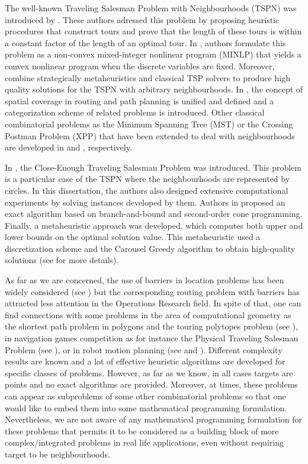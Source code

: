 \documentclass[a4paper,  review, authoryear, 1p.]{elsarticle}
\newcommand{\CV}[1]{{\color{red}#1}}
\begin{document}
		The well-known Traveling Salesman Problem with Neighbourhoods (TSPN) was introduced by \citet{arkin_approximation_1994}. These authors adressed this problem by proposing heuristic procedures that construct tours and prove that the length of these tours is within a constant factor of the length of an optimal tour. In \citet{gentilini_travelling_2013}, authors formulate this problem as a non-convex mixed-integer nonlinear program (MINLP) that yields a convex nonlinear program when the discrete variables are fixed. Moreover, \citet{yuan_towards_2017} combine strategically metaheuristics and classical TSP solvers to produce high quality solutions for the TSPN with arbitrary neighbourhoods. In \citet{glock_spatial_2022}, the concept of spatial coverage in routing and path planning is unified and defined and a categorization scheme of related problems is introduced. Other classical combinatorial problems as the Minimum Spanning Tree (MST) or the Crossing Postman Problem (XPP) that have been  extended to deal with neighbourhoods are developed in \citet{blanco_minimum_2017} and \citet{puerto_routing_2022}, respectively. 
		
		\CV{In \citet{mennell_heuristics_2009}, the Close-Enough Traveling Salesman Problem was introduced. This problem is a particular case of the TSPN where the neighbourhoods are represented by circles. In this dissertation, the authors also designed extensive computational experiments by solving instances developed by them. Authors in \citet{coutinho_branch-and-bound_2016} proposed an exact algorithm based on branch-and-bound and second-order cone programming. Finally, a metaheuristic approach was developed,  which computes both upper and lower bounds on the optimal solution value. This metaheuristic used a  discretization scheme and the Carousel Greedy algorithm to obtain high-quality solutions (see \citet{carrabs_adaptive_2020} for more details).}
		
		As far as we are concerned, the use of barriers in location problems has been widely considered (see \citet{klamroth_single-facility_2002}) but the corresponding routing problem with barriers  has attracted less attention in the Operations Research field. In spite of that, one can find connections with some problems in the area of computational geometry as the shortest path problem in polygons and the touring polytopes problem (see \citet{mitchell_shortest_2017}), in navigation games competition  as for instance the Physical Traveling Salesman Problem (see \citet{perez_solving_2014}), or in robot motion planning (see \citet{hwang_potential_1992} and \citet{laumond_motion_1994}).  Different complexity results are known and a lot of effective heuristic algorithms are developed for specific classes of problems. However, as far as we know, in all cases targets are points and no exact algorithms are provided. Moreover, at times, these problems can appear as  subproblems of some other combinatorial problems so that one would like to embed them into some mathematical programming formulation. Nevertheless, we are not aware of any mathematical programming formulation for these problems that permits it to be considered as a building block of more complex/integrated problems in real life applications, even without requiring target to be neighbourhoods.
		
\end{document}

